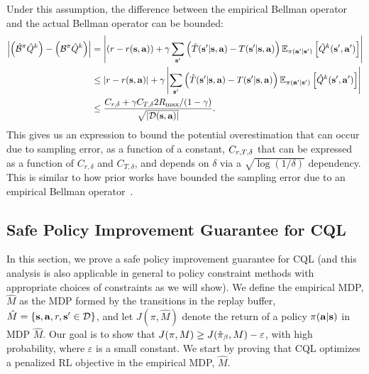 Under this assumption, the difference between the empirical Bellman operator and the actual Bellman operator can be bounded:
\begin{align*}
    \left\vert\left(\hat{\mathcal{B}}^\pi \hat{Q}^k \right) - \left({\mathcal{B}}^\pi \hat{Q}^k \right)\right\vert &= \left\vert\left(r - r(\mathbf{s}, \mathbf{a})\right) + \gamma \sum_{\mathbf{s}'} \left(\hat{T}(\mathbf{s}'|\mathbf{s}, \mathbf{a}) - T(\mathbf{s}'|\mathbf{s},\mathbf{a})\right) \mathbb{E}_{\pi(\mathbf{a}'|\mathbf{s}')}\left[\hat{Q}^k(\mathbf{s}' , \mathbf{a}')\right]\right\vert\\
    &\leq \left\vert r - r(\mathbf{s}, \mathbf{a})\right\vert + \gamma \left\vert \sum_{\mathbf{s}'} \left(\hat{T}(\mathbf{s}'|\mathbf{s}, \mathbf{a}) - T(\mathbf{s}'|\mathbf{s},\mathbf{a})\right) \mathbb{E}_{\pi(\mathbf{a}'|\mathbf{s}')}\left[\hat{Q}^k(\mathbf{s}' , \mathbf{a}')\right]\right\vert\\
    &\leq \frac{C_{r, \delta} + \gamma C_{T, \delta} 2R_{\max} / (1 - \gamma)}{\sqrt{|\mathcal{D}(\mathbf{s}, \mathbf{a})|}}. 
\end{align*}
This gives us an expression to bound the potential overestimation that can occur due to sampling error, as a function of a constant, $C_{r, T, \delta}$ that can be expressed as a function of $C_{r, \delta}$ and $C_{T, \delta}$, and depends on $\delta$ via a $\sqrt{\log (1/\delta)}$ dependency. This is similar to how prior works have bounded the sampling error due to an empirical Bellman operator~\citep{osband2017posterior,jaksch2010near}.

\subsection{Safe Policy Improvement Guarantee for CQL}
\label{app:safe_pi}
In this section, we prove a safe policy improvement guarantee for CQL (and this analysis is also applicable in general to policy constraint methods with appropriate choices of constraints as we will show). We define the empirical MDP, $\hat{M}$ as the MDP formed by the transitions in the replay buffer, $\hat{M} = \{\mathbf{s}, \mathbf{a}, r, \mathbf{s}' \in \mathcal{D} \}$, and let $J(\pi, \hat{M})$ denote the return of a policy $\pi(\mathbf{a}|\mathbf{s})$ in MDP $\hat{M}$. Our goal is to show that $J(\pi, M) \geq J(\hat{\pi}_\beta, M) - \varepsilon$, with high probability, where $\varepsilon$ is a small constant. We start by proving that CQL optimizes a penalized RL objective in the empirical MDP, $\hat{M}$.


